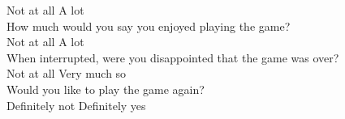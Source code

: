 \documentclass[../II2202-proposal.tex]{subfiles}
\begin{document}
Not at all      \quad A lot
\vspace{2mm} \\
How much would you say you enjoyed playing the game?  \\
Not at all      \quad A lot
\vspace{2mm} \\
When interrupted, were you disappointed that the game was over? \\
Not at all      \quad Very much so
\vspace{2mm} \\
Would you like to play the game again? \\
Definitely not      \quad Definitely yes
\end{document}
